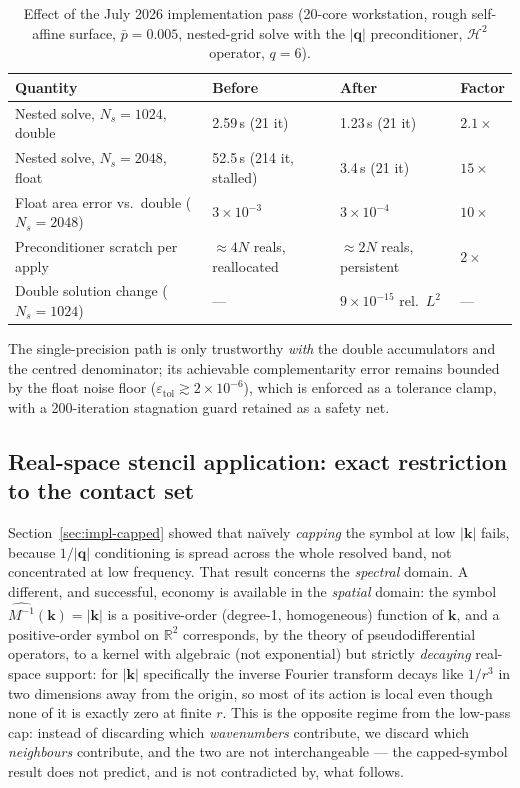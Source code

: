 \documentclass[11pt,a4paper]{article}
\begin{document}
\begin{table}[ht]
\centering
\caption{Effect of the July 2026 implementation pass (20-core workstation,
         rough self-affine surface, $\bar p = 0.005$, nested-grid solve with
         the $|\mathbf q|$ preconditioner, $\mathcal H^2$ operator, $q = 6$).}
\label{tab:impl}
\begin{tabular}{@{}llll@{}}
\toprule
Quantity & Before & After & Factor \\
\midrule
Nested solve, $N_s{=}1024$, double        & 2.59\,s (21 it) & 1.23\,s (21 it) & $2.1\times$ \\
Nested solve, $N_s{=}2048$, float         & 52.5\,s (214 it, stalled) & 3.4\,s (21 it) & $15\times$ \\
Float area error vs.\ double ($N_s{=}2048$) & $3\times10^{-3}$ & $3\times10^{-4}$ & $10\times$ \\
Preconditioner scratch per apply          & $\approx 4N$ reals, reallocated & $\approx 2N$ reals, persistent & $2\times$ \\
Double solution change ($N_s{=}1024$)     & --- & $9\times10^{-15}$ rel.\ $L^2$ & --- \\
\bottomrule
\end{tabular}
\end{table}

\noindent
The single-precision path is only trustworthy \emph{with} the double
accumulators and the centred denominator; its achievable complementarity
error remains bounded by the float noise floor
($\varepsilon_{\mathrm{tol}} \gtrsim 2\times10^{-6}$), which is enforced as a
tolerance clamp, with a 200-iteration stagnation guard retained as a safety
net.

\subsection{Real-space stencil application: exact restriction to the contact set}
\label{sec:impl-stencil}

Section~\ref{sec:impl-capped} showed that na\"ively \emph{capping} the symbol
at low $|\mathbf k|$ fails, because $1/|\mathbf q|$ conditioning is spread
across the whole resolved band, not concentrated at low frequency. That
result concerns the \emph{spectral} domain. A different, and successful,
economy is available in the \emph{spatial} domain: the symbol
$\widehat{M^{-1}}(\mathbf k) = |\mathbf k|$ is a positive-order (degree-1,
homogeneous) function of $\mathbf k$, and a positive-order symbol on
$\mathbb R^2$ corresponds, by the theory of pseudodifferential operators, to a
kernel with algebraic (not exponential) but strictly \emph{decaying}
real-space support: for $|\mathbf k|$ specifically the inverse Fourier
transform decays like $1/r^3$ in two dimensions away from the origin, so most
of its action is local even though none of it is exactly zero at finite $r$.
This is the opposite regime from the low-pass cap: instead of discarding
which \emph{wavenumbers} contribute, we discard which \emph{neighbours}
contribute, and the two are not interchangeable — the capped-symbol result
does not predict, and is not contradicted by, what follows.
\end{document}
